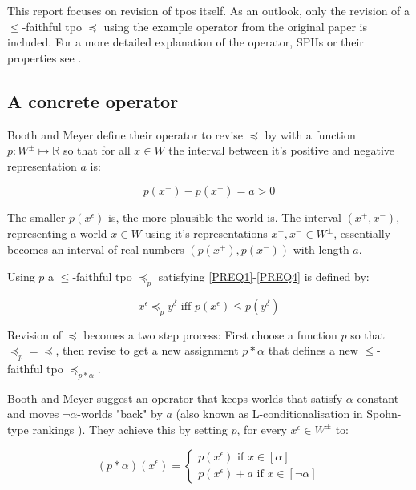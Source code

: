 \documentclass[english, 12pt]{scrartcl}
\theoremstyle{definition}
\theoremstyle{definition}
\theoremstyle{definition}
\begin{document}
This report focuses on revision of tpos itself. As an outlook, only the revision of a $\leq$-faithful tpo $\preceq$ using the example operator from the original paper is included. For a more detailed explanation of the operator, SPHs or their properties see \cite{Booth2011}.

\subsection{A concrete operator}
Booth and Meyer define their operator to revise $\preceq$ by with a function $p: W^{\pm} \mapsto \mathds{R}$ so that for all $x \in W$ the interval between it's positive and negative representation $a$ is:

\begin{equation*}
    p(x^{-}) - p(x^{+}) = a > 0
\end{equation*}

The smaller $p(x^{\epsilon})$ is, the more plausible the world is. The interval $(x^{+}, x^{-})$, representing a world $x \in W$ using it's representations $x^{+}, x^{-} \in W^{\pm}$, essentially becomes an interval of real numbers $(p(x^{+}), p(x^{-}))$ with length $a$.

\bigskip

Using $p$ a $\leq$-faithful tpo $\preceq_{p}$ satisfying \ref{PREQ1}-\ref{PREQ4} is defined by:

\begin{equation*}
    x^{\epsilon} \preceq_{p} y^{\delta} \textrm{ iff } p(x^{\epsilon}) \leq p(y^{\delta} )
\end{equation*}

\bigskip

Revision of $\preceq$ becomes a two step process: First choose a function $p$ so that $\preceq_{p} = \preceq$, then revise to get a new assignment $p \ast \alpha$ that defines a new $\leq$-faithful tpo $\preceq_{p \ast \alpha}$.

Booth and Meyer suggest an operator that keeps worlds that satisfy $\alpha$ constant and moves $\neg\alpha$-worlds "back" by $a$ (also known as L-conditionalisation in Spohn-type rankings \cite{Geffner1992}). They achieve this by setting $p$, for every $x^{\epsilon} \in W^{\pm}$ to:
    
\begin{equation*}
    (p \ast \alpha)(x^{\epsilon}) = \left\{
                    \begin{array}{ll}
                      p(x^{\epsilon}) \textrm{ if } x \in [\alpha]\\
                      p(x^{\epsilon}) + a \textrm{ if } x \in [\neg\alpha]
                    \end{array}
                  \right.
\end{equation*}
\end{document}
